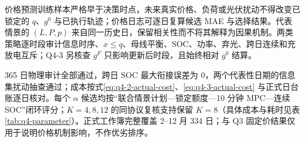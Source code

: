 价格预测训练样本严格早于决策时点，未来真实价格、负荷或光伏扰动不得改变已锁定的 $q$、$g^0$ 与已执行轨迹；价格日志可逐日复算候选 MAE 与选择结果。代表情景的 $(L,P,p)$ 来自同一历史日，保留相关性而不将其解释为因果机制。两类策略逐时段审计信息时序、$x\le q$、母线平衡、SOC、功率、弃光、跨日连续和充放电互斥；Q4-3 另核查 $g^F$ 只影响更新后时段，且始终相对 $g^0$ 结算。

365 日物理审计全部通过，跨日 SOC 最大衔接误差为 0，两个代表性日期的信息集扰动抽查通过；成本按式\eqref{eq:q4-2-actual-cost}、\eqref{eq:q4-3-actual-cost} 与正式日台账逐日核对。每个 $\alpha$ 候选均按“联合情景计划—锁定额度—10 分钟 MPC—连续 SOC”闭环评分；$K=4,8,12$ 的同协议复核支持保留 $K=8$（具体成本与耗时见表\ref{tab:q4-parameter}）。正式工作簿完整覆盖 2--12 月 334 日；与 Q3 固定价结果仅用于说明价格机制影响，不作优劣排序。
